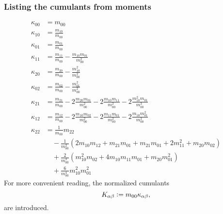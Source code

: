\documentclass{article}
\begin{document}
\subsubsection{Listing the cumulants from moments}
\label{subs:Listing the cumulants from moments}
\begin{align}
  \kappa_{00} & = m_{00} \\
  \kappa_{10} & = \frac{m_{10}}{m_{00}} \\
  \kappa_{01} & = \frac{m_{01}}{m_{00}} \\
  \kappa_{11} & = \frac{m_{11}}{m_{00}} - \frac{m_{10}m_{01}}{m_{00}^2} \\
  \kappa_{20} & = \frac{m_{20}}{m_{00}} - \frac{m_{10}^2}{m_{00}^2} \\
  \kappa_{02} & = \frac{m_{02}}{m_{00}} - \frac{m_{01}^2}{m_{00}^2} \\
  \kappa_{21} & = \frac{m_{21}}{m_{00}} - 2\frac{m_{20}m_{01}}{m_{00}^2}
            - 2\frac{m_{10}m_{11}}{m_{00}^2} - 2\frac{m_{10}^2 m_{01}}{m_{00}^3} \\
  \kappa_{12} & = \frac{m_{12}}{m_{00}} - 2\frac{m_{10}m_{02}}{m_{00}^2}
            - 2\frac{m_{11}m_{01}}{m_{00}^2} - 2\frac{m_{10} m_{01}^2}{m_{00}^3} \\
  \kappa_{22} & = \frac{1}{m_{00}} m_{22} \\
    &\quad
    - \frac{1}{m_{00}^2}
    \left(
       2 m_{10}m_{12}  + m_{21}m_{01} + m_{21}m_{01} + 2 m_{11}^2 + m_{20}m_{02}
    \right) \\
    &\quad
    + \frac{2}{m_{00}^3}
      \left(
        m_{10}^2 m_{02} + 4 m_{10}m_{11}m_{01} + m_{20}m_{01}^2
      \right)\\
    &\quad
       + \frac{6}{m_{00}^4} m_{10}^2 m_{01}^2
\end{align}
For more convenient reading, the normalized cumulants
\begin{equation}
  \label{eq: definition normalized cumulants}
  K_{\alpha\beta} \mathrel{\mathop:}= m_{00}\kappa_{\alpha\beta},
\end{equation}
are introduced.
\end{document}
